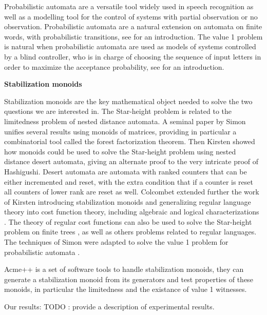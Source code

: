 Probabilistic automata are a versatile tool widely used in speech recognition as well as a modelling tool 
for the control of systems with partial observation or no observation.
Probabilistic automata are a natural extension on automata on finite words,
with probabilistic transitions, see \cite{Rabin63} for an introduction.
The value 1 problem is natural when probabilistic automata are used as models
of systems controlled by a blind controller, who is in charge of choosing the
sequence of input letters in order to maximize the acceptance
probability, see \cite{FGO12} for an introduction.
\smallskip

\textbf{Stabilization monoids}

Stabilization monoids are the key mathematical object needed to solve the two questions we are interested in.
The Star-height problem is related to the limitedness problem of nested distance automata.
A seminal paper by Simon \cite{Sim94} unifies several results using monoids of matrices, providing in particular a combinatorial tool called the forest factorization theorem. 
Then Kirsten showed how monoids could be used to solve the Star-height problem using nested distance desert automata,
giving an alternate proof to the very intricate proof of Hashigushi.
Desert automata are automata with ranked counters that can be either incremented and reset,
with the extra condition that if a counter is reset all counters of lower rank are reset as well.
Colcombet extended further the work of Kirsten introducing stabilization monoids and generalizing regular language theory into cost function theory, including algebraic and logical characterizations \cite{Colcombet09,CKL10,Kup14}. The theory of regular cost functions can also be used to solve the Star-height problem on finite trees \cite{CL08sh}, as well as others problems related to regular languages.
The techniques of Simon were adapted to solve the value 1 problem for probabilistic automata \cite{FGO12}.


Acme++ is a set of software tools to handle stabilization monoids, they can generate a stabilization monoid from its generators and test properties of these monoids, in particular the limitedness and the existance of value 1 witnesses.

Our results:
TODO : provide a description of experimental results.